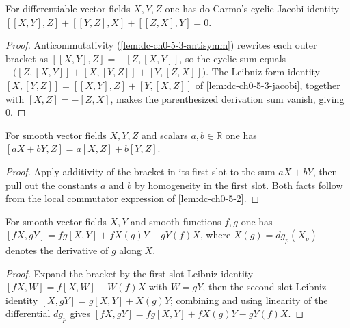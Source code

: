 \begin{lemma}
  \label{lem:dc-ch0-5-3-jacobi-cyclic}
  \leanok
  For differentiable vector fields $X,Y,Z$ one has do Carmo's cyclic Jacobi
  identity $[[X,Y],Z]+[[Y,Z],X]+[[Z,X],Y]=0$.
\end{lemma}
\begin{proof}
  \leanok
  Anticommutativity (\cref{lem:dc-ch0-5-3-antisymm}) rewrites each outer bracket as
  $[[X,Y],Z]=-[Z,[X,Y]]$, so the cyclic sum equals
  $-\big([Z,[X,Y]]+[X,[Y,Z]]+[Y,[Z,X]]\big)$. The Leibniz-form identity
  $[X,[Y,Z]]=[[X,Y],Z]+[Y,[X,Z]]$ of \cref{lem:dc-ch0-5-3-jacobi}, together with
  $[X,Z]=-[Z,X]$, makes the parenthesized derivation sum vanish, giving $0$.
\end{proof}

\begin{lemma}
  \label{lem:dc-ch0-5-3-bilinear}
  \leanok
  For smooth vector fields $X,Y,Z$ and scalars $a,b\in\mathbb{R}$ one has
  $[aX+bY,Z]=a[X,Z]+b[Y,Z]$.
\end{lemma}
\begin{proof}
  \leanok
  Apply additivity of the bracket in its first slot to the sum $aX+bY$, then pull
  out the constants $a$ and $b$ by homogeneity in the first slot. Both facts follow
  from the local commutator expression of \cref{lem:dc-ch0-5-2}.
\end{proof}

\begin{lemma}
  \label{lem:dc-ch0-5-3-leibniz}
  \leanok
  For smooth vector fields $X,Y$ and smooth functions $f,g$ one has
  $[fX,gY]=fg[X,Y]+fX(g)Y-gY(f)X$, where $X(g)=dg_p(X_p)$ denotes the derivative
  of $g$ along $X$.
\end{lemma}
\begin{proof}
  \leanok
  Expand the bracket by the first-slot Leibniz identity
  $[fX,W]=f[X,W]-W(f)X$ with $W=gY$, then the second-slot Leibniz identity
  $[X,gY]=g[X,Y]+X(g)Y$; combining and using linearity of the differential
  $dg_p$ gives $[fX,gY]=fg[X,Y]+fX(g)Y-gY(f)X$.
\end{proof}

